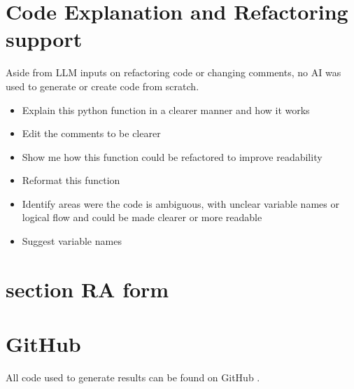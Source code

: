 \section{Code Explanation and Refactoring support}
Aside from LLM inputs on refactoring code or changing comments, no AI was used to generate or create code from scratch. 
\begin{itemize}
    \item Explain this python function in a clearer manner and how it works
    \item Edit the comments to be clearer
    \item Show me how this function could be refactored to improve readability
    \item Reformat this function
    \item Identify areas were the code is ambiguous, with unclear variable names or logical flow and could be made clearer or more readable
    \item Suggest variable names
\end{itemize}


\section{section RA form}



\section{GitHub}

All code used to generate results can be found on GitHub \cite{farrell_fyp_2026}. 